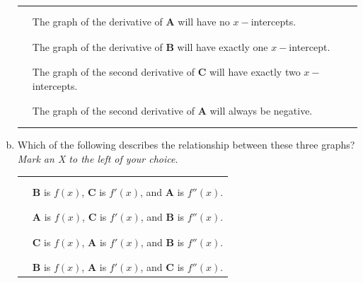 \documentclass[notes]{subfiles}
\begin{document}
\begin{ex}
\begin{enumerate}[(a)]
\begin{center}
\begin{tabular}{ll}
								& \\ &\\
							\makebox[1in]{\hrulefill} & The graph of the derivative of \textbf{A} will have no $x-$intercepts.\\
								& \\ &\\
							\makebox[1in]{\hrulefill} & The graph of the derivative of \textbf{B} will have exactly one $x-$intercept.\\
								&\\ &\\
							\makebox[1in]{\hrulefill} & The graph of the second derivative of \textbf{C} will have exactly two $x-$intercepts.\\
								&\\ &\\
							\makebox[1in]{\hrulefill} & The graph of the second derivative of \textbf{A} will always be negative.\\
								&\\ &\\
							\end{tabular}
						\end{center}
					\item Which of the following describes the relationship between these three graphs?  \emph{Mark an X to the left of your choice}.
						\begin{center}
							\begin{tabular}{ll}
								& \\ & \\
							\makebox[1in]{\hrulefill} & \textbf{B} is $f(x)$, \textbf{C} is $f'(x)$, and \textbf{A} is $f''(x)$.\\
								&\\ &\\
							\makebox[1in]{\hrulefill} & \textbf{A} is $f(x)$, \textbf{C} is $f'(x)$, and \textbf{B} is $f''(x)$.\\
								&\\ &\\
							\makebox[1in]{\hrulefill} & \textbf{C} is $f(x)$, \textbf{A} is $f'(x)$, and \textbf{B} is $f''(x)$.\\  
								&\\ &\\
							\makebox[1in]{\hrulefill} & \textbf{B} is $f(x)$, \textbf{A} is $f'(x)$, and \textbf{C} is $f''(x)$.\\  
							\end{tabular}
						\end{center}
				\end{enumerate}
			\end{ex}
	\clearpage
\end{document}
